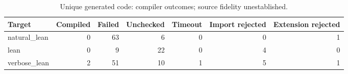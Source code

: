 \begin{table}[htbp]
\centering
\caption{Unique generated code: compiler outcomes; source fidelity unestablished.}
\label{tab:compilation}
\small
\begin{adjustbox}{max width=\textwidth}
\begin{tabular}{lrrrrrr}
\toprule
Target & Compiled & Failed & Unchecked & Timeout & Import rejected & Extension rejected \\
\midrule
natural\_lean & 0 & 63 & 6 & 0 & 0 & 1 \\
lean & 0 & 9 & 22 & 0 & 4 & 0 \\
verbose\_lean & 2 & 51 & 10 & 1 & 5 & 1 \\
\bottomrule
\end{tabular}
\end{adjustbox}
\end{table}
